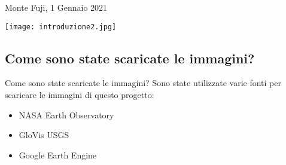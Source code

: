 \documentclass{beamer}
\begin{document}


\begin{frame}{Monte Fuji, 1 Gennaio 2021}

\centering
\texttt{[image: introduzione2.jpg]}
    
\end{frame}


\subsection{Come sono state scaricate le immagini?}

\begin{frame}{Come sono state scaricate le immagini?}
Sono state utilizzate varie fonti per scaricare le immagini di questo progetto:
\bigskip
\begin{itemize}
    \item NASA Earth Observatory
    \item GloVis USGS
    \item Google Earth Engine
    \end{itemize}

    
\end{frame}
\end{document}
